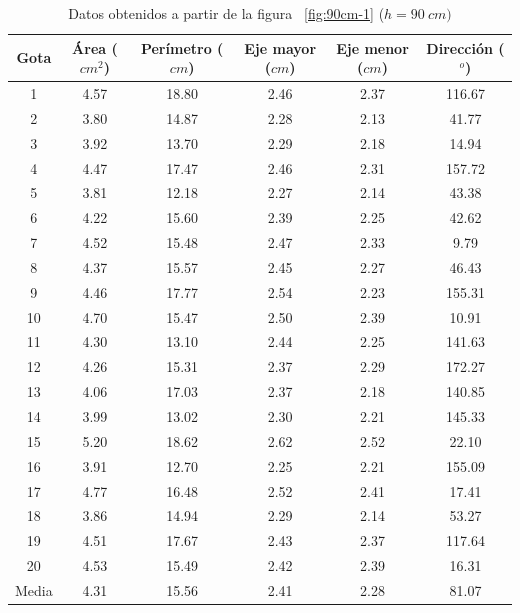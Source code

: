 \begin{table}[H] \centering \caption{Datos obtenidos a partir de la figura
    ~\ref{fig:90cm-1} ($h=90\ cm)$} \label{tab:90cm} \begin{tabular}{cccccc}
        \toprule Gota & Área ($cm^2$) & Perímetro ($cm$) & Eje mayor ($cm$) &
        Eje menor ($cm$) & Dirección ($^o$) \\ \midrule 1  & 4.57 & 18.80 &
        2.46 & 2.37 & 116.67 \\ 2  & 3.80 & 14.87 & 2.28 & 2.13 & 41.77  \\ 3
             & 3.92 & 13.70 & 2.29 & 2.18 & 14.94  \\ 4  & 4.47 & 17.47 & 2.46
             & 2.31 & 157.72 \\ 5  & 3.81 & 12.18 & 2.27 & 2.14 & 43.38  \\ 6
             & 4.22 & 15.60 & 2.39 & 2.25 & 42.62  \\ 7  & 4.52 & 15.48 & 2.47
             & 2.33 & 9.79   \\ 8  & 4.37 & 15.57 & 2.45 & 2.27 & 46.43  \\ 9
             & 4.46 & 17.77 & 2.54 & 2.23 & 155.31 \\ 10 & 4.70 & 15.47 & 2.50
             & 2.39 & 10.91  \\ 11 & 4.30 & 13.10 & 2.44 & 2.25 & 141.63 \\ 12
             & 4.26 & 15.31 & 2.37 & 2.29 & 172.27 \\ 13 & 4.06 & 17.03 & 2.37
             & 2.18 & 140.85 \\ 14 & 3.99 & 13.02 & 2.30 & 2.21 & 145.33 \\ 15
             & 5.20 & 18.62 & 2.62 & 2.52 & 22.10  \\ 16 & 3.91 & 12.70 & 2.25
             & 2.21 & 155.09 \\ 17 & 4.77 & 16.48 & 2.52 & 2.41 & 17.41  \\ 18
             & 3.86 & 14.94 & 2.29 & 2.14 & 53.27  \\ 19 & 4.51 & 17.67 & 2.43
             & 2.37 & 117.64 \\ 20 & 4.53 & 15.49 & 2.42 & 2.39 & 16.31  \\
    \midrule Media & 4.31 & 15.56 & 2.41 & 2.28 & 81.07  \\ \bottomrule
\end{tabular} \end{table}

